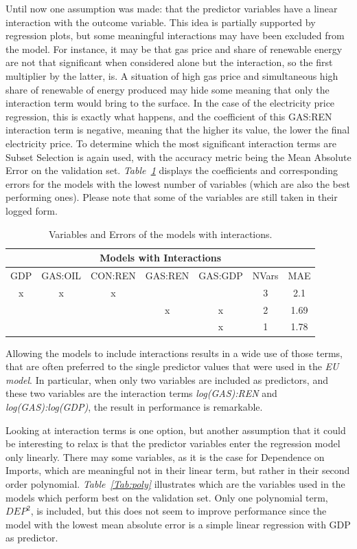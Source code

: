 \documentclass[a4paper,12pt]{book}
\begin{document}
Until now one assumption was made: that the predictor variables have a linear interaction with the outcome variable. This idea is partially supported by regression plots, but some meaningful interactions may have been excluded from the model. For instance, it may be that gas price and share of renewable energy are not that significant when considered alone but the interaction, so the first multiplier by the latter, is. A situation of high gas price and simultaneous high share of renewable of energy produced may hide some meaning that only the interaction term would bring to the surface. In the case of the electricity price regression, this is exactly what happens, and the coefficient of this GAS:REN interaction term is negative, meaning that the higher its value, the lower the final electricity price. To determine which the most significant interaction terms are Subset Selection is again used, with the accuracy metric being the Mean Absolute Error on the validation set. \textit{Table~\ref{Tab:int}} displays the coefficients and corresponding errors for the models with the lowest number of variables (which are also the best performing ones). Please note that some of the variables are still taken in their logged form.

\begin{table}[tb]
\begin{center}
\begin{tabular}{|c|c|c|c|c|c|c|}
\hline
\multicolumn{7}{|c|}{Models with Interactions}\\
\hline
GDP&GAS:OIL&CON:REN&GAS:REN&GAS:GDP&NVars&MAE\\
\hline
x&x&x&&&3&2.1\\
&&&x&x&2&1.69\\
&&&&x&1&1.78\\
\hline
\end{tabular}
\caption{Variables and Errors of the models with interactions.}
\label{Tab:int}
\end{center}
\end{table}

Allowing the models to include interactions results in a wide use of those terms, that are often preferred to the single predictor values that were used in the \textit{EU model}. In particular, when only two variables are included as predictors, and these two variables are the interaction terms \textit{log(GAS):REN} and \textit{log(GAS):log(GDP)}, the result in performance is remarkable.

Looking at interaction terms is one option, but another assumption that it could be interesting to relax is that the predictor variables enter the regression model only linearly. There may some variables, as it is the case for Dependence on Imports, which are meaningful not in their linear term, but rather in their second order polynomial. \textit{Table~\ref{Tab:poly}} illustrates which are the variables used in the models which perform best on the validation set. Only one polynomial term, $DEP^2$, is included, but this does not seem to improve performance since the model with the lowest mean absolute error is a simple linear regression with GDP as predictor.
\end{document}
